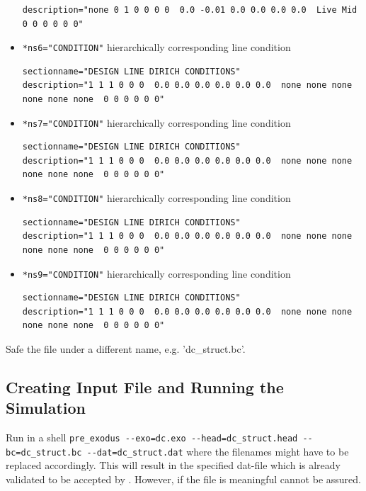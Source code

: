 \begin{itemize}
\begin{small}
\begin{verbatim}
description="none 0 1 0 0 0 0  0.0 -0.01 0.0 0.0 0.0 0.0  Live Mid 0 0 0 0 0 0"
 \end{verbatim} \end{small}
 \item \verb|*ns6="CONDITION"| \qquad hierarchically corresponding line condition
 \begin{small} \begin{verbatim}
sectionname="DESIGN LINE DIRICH CONDITIONS"
description="1 1 1 0 0 0  0.0 0.0 0.0 0.0 0.0 0.0  none none none none none none  0 0 0 0 0 0"
 \end{verbatim} \end{small}
 \item \verb|*ns7="CONDITION"| \qquad hierarchically corresponding line condition
 \begin{small} \begin{verbatim}
sectionname="DESIGN LINE DIRICH CONDITIONS"
description="1 1 1 0 0 0  0.0 0.0 0.0 0.0 0.0 0.0  none none none none none none  0 0 0 0 0 0"
 \end{verbatim} \end{small}
 \item \verb|*ns8="CONDITION"| \qquad hierarchically corresponding line condition
 \begin{small} \begin{verbatim}
sectionname="DESIGN LINE DIRICH CONDITIONS"
description="1 1 1 0 0 0  0.0 0.0 0.0 0.0 0.0 0.0  none none none none none none  0 0 0 0 0 0"
 \end{verbatim} \end{small}
 \item \verb|*ns9="CONDITION"| \qquad hierarchically corresponding line condition
 \begin{small} \begin{verbatim}
sectionname="DESIGN LINE DIRICH CONDITIONS"
description="1 1 1 0 0 0  0.0 0.0 0.0 0.0 0.0 0.0  none none none none none none  0 0 0 0 0 0"
 \end{verbatim} \end{small}

\end{itemize}

Safe the file under a different name, e.g. 'dc\_struct.bc'.

\subsection{Creating \baci{} Input File and Running the Simulation}
Run in a shell \verb|pre_exodus --exo=dc.exo --head=dc_struct.head --bc=dc_struct.bc --dat=dc_struct.dat| where the filenames might have to be replaced accordingly. This will result in the specified dat-file which is already validated to be accepted by \baci{}. However, if the file is meaningful cannot be assured.

